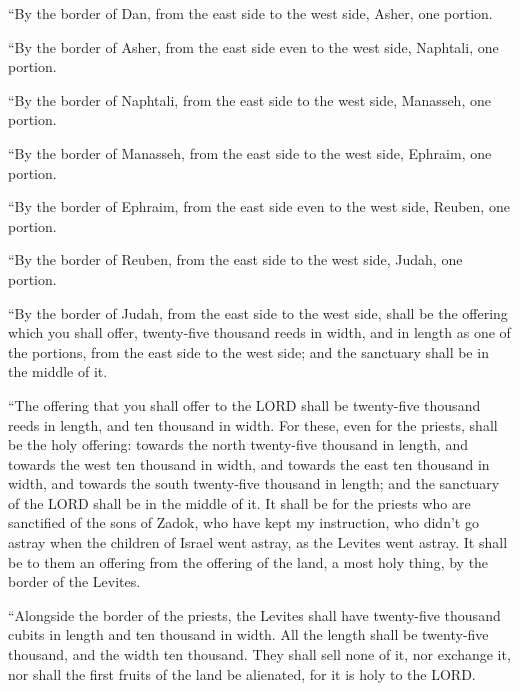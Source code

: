  ``By the border of Dan, from the east side to the west
side, Asher, one portion.

 ``By the border of Asher, from the east side even to the
west side, Naphtali, one portion.

 ``By the border of Naphtali, from the east side to the
west side, Manasseh, one portion.

 ``By the border of Manasseh, from the east side to the
west side, Ephraim, one portion.

 ``By the border of Ephraim, from the east side even to
the west side, Reuben, one portion.

 ``By the border of Reuben, from the east side to the west
side, Judah, one portion.

 ``By the border of Judah, from the east side to the west
side, shall be the offering which you shall offer, twenty-five thousand
reeds in width, and in length as one of the portions, from the east side
to the west side; and the sanctuary shall be in the middle of it.

 ``The offering that you shall offer to the LORD shall be
twenty-five thousand reeds in length, and ten thousand in width.
 For these, even for the priests, shall be the holy
offering: towards the north twenty-five thousand in length, and towards
the west ten thousand in width, and towards the east ten thousand in
width, and towards the south twenty-five thousand in length; and the
sanctuary of the LORD shall be in the middle of it.  It
shall be for the priests who are sanctified of the sons of Zadok, who
have kept my instruction, who didn't go astray when the children of
Israel went astray, as the Levites went astray.  It shall
be to them an offering from the offering of the land, a most holy thing,
by the border of the Levites.

 ``Alongside the border of the priests, the Levites shall
have twenty-five thousand cubits in length and ten thousand in width.
All the length shall be twenty-five thousand, and the width ten
thousand.  They shall sell none of it, nor exchange it,
nor shall the first fruits of the land be alienated, for it is holy to
the LORD.

